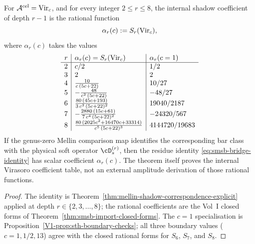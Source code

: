 \begin{theorem}
\label{thm:soft-hierarchy-r-leq-8}
For \(\mathcal A^{\mathrm{cel}}=\mathrm{Vir}_c\), and for every integer
\(2\leq r\leq 8\), the internal shadow coefficient of depth \(r-1\)
is the rational function
\begin{equation}
\label{eq:smsb-r-coefficient-table}
 \alpha_r(c) := S_r(\mathrm{Vir}_c),
\end{equation}
where $\alpha_r(c)$ takes the values
\[
 \begin{array}{r|l|l}
 r & \alpha_r(c) = S_r(\mathrm{Vir}_c) & \alpha_r(c = 1) \\ \hline
 2 & c / 2 & 1/2 \\
 3 & 2 & 2 \\
 4 & \tfrac{10}{c\,(5 c + 22)} & 10/27 \\
 5 & -\tfrac{48}{c^{2}\,(5 c + 22)} & -48/27 \\
 6 & \tfrac{80\,(45 c + 193)}{3\, c^{3}\,(5 c + 22)^{2}} & 19040 / 2187 \\
 7 & -\tfrac{2880\,(15 c + 61)}{7\, c^{4}\,(5 c + 22)^{2}} & -24320 / 567 \\
 8 & \tfrac{80\,(2025 c^{2} + 16470 c + 33314)}{c^{5}\,(5 c + 22)^{3}}
 & 4144720 / 19683
 \end{array}
\]
If the genus-zero Mellin comparison map identifies the corresponding
bar class with the physical soft operator \(\cD_s^{(r)}\), then the
residue identity \eqref{eq:smsb-bridge-identity} has scalar coefficient
\(\alpha_r(c)\).  The theorem itself proves the internal Virasoro
coefficient table, not an external amplitude derivation of those
rational functions.
\end{theorem}

\begin{proof}
The identity is
Theorem~\ref{thm:mellin-shadow-correspondence-explicit} applied at
depth $r \in \{2, 3, \ldots, 8\}$; the rational coefficients are the
Vol~I closed forms of Theorem~\ref{thm:smsb-import-closed-forms}. The
$c = 1$ specialisation is
Proposition~\ref{V1-prop:sth-boundary-checks}; all three boundary values
($c = 1, 1/2, 13$) agree with the closed rational forms
for $S_6$, $S_7$, and $S_8$.
\end{proof}

